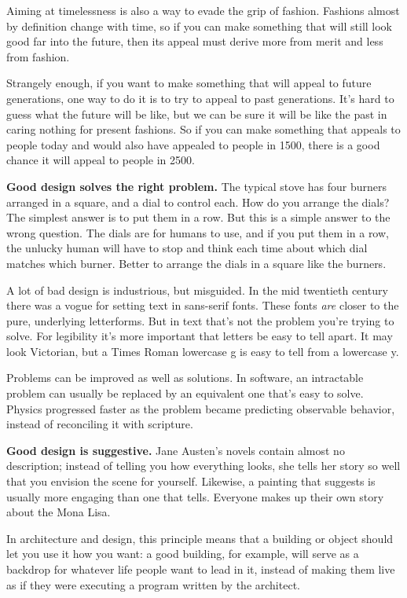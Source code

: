 Aiming at timelessness is also a way to evade the grip of fashion.
Fashions almost by definition change with time, so if you can make
something that will still look good far into the future, then its appeal
must derive more from merit and less from fashion.

Strangely enough, if you want to make something that will appeal to
future generations, one way to do it is to try to appeal to past
generations. It's hard to guess what the future will be like, but we can
be sure it will be like the past in caring nothing for present fashions.
So if you can make something that appeals to people today and would also
have appealed to people in 1500, there is a good chance it will appeal
to people in 2500.

\textbf{Good design solves the right problem.} The typical stove has
four burners arranged in a square, and a dial to control each. How do
you arrange the dials? The simplest answer is to put them in a row. But
this is a simple answer to the wrong question. The dials are for humans
to use, and if you put them in a row, the unlucky human will have to
stop and think each time about which dial matches which burner. Better
to arrange the dials in a square like the burners.

A lot of bad design is industrious, but misguided. In the mid twentieth
century there was a vogue for setting text in sans-serif fonts. These
fonts \emph{are} closer to the pure, underlying letterforms. But in text
that's not the problem you're trying to solve. For legibility it's more
important that letters be easy to tell apart. It may look Victorian, but
a Times Roman lowercase g is easy to tell from a lowercase y.

Problems can be improved as well as solutions. In software, an
intractable problem can usually be replaced by an equivalent one that's
easy to solve. Physics progressed faster as the problem became
predicting observable behavior, instead of reconciling it with
scripture.

\textbf{Good design is suggestive.} Jane Austen's novels contain almost
no description; instead of telling you how everything looks, she tells
her story so well that you envision the scene for yourself. Likewise, a
painting that suggests is usually more engaging than one that tells.
Everyone makes up their own story about the Mona Lisa.

In architecture and design, this principle means that a building or
object should let you use it how you want: a good building, for example,
will serve as a backdrop for whatever life people want to lead in it,
instead of making them live as if they were executing a program written
by the architect.

